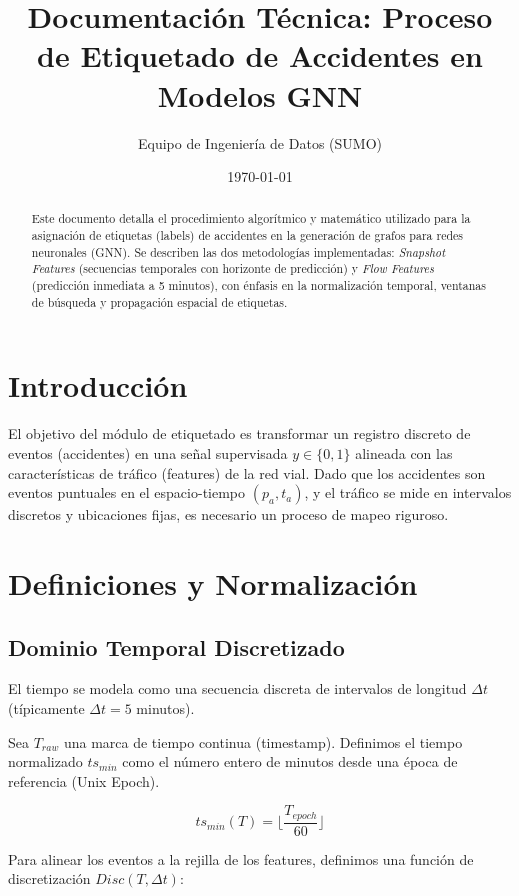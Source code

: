 \documentclass[11pt, letterpaper]{article}
\title{\textbf{Documentación Técnica: Proceso de Etiquetado de Accidentes en Modelos GNN}}
\author{Equipo de Ingeniería de Datos (SUMO)}
\date{\today}
\begin{document}
\maketitle

\begin{abstract}
Este documento detalla el procedimiento algorítmico y matemático utilizado para la asignación de etiquetas (labels) de accidentes en la generación de grafos para redes neuronales (GNN). Se describen las dos metodologías implementadas: \textit{Snapshot Features} (secuencias temporales con horizonte de predicción) y \textit{Flow Features} (predicción inmediata a 5 minutos), con énfasis en la normalización temporal, ventanas de búsqueda y propagación espacial de etiquetas.
\end{abstract}

\tableofcontents

\section{Introducción}
El objetivo del módulo de etiquetado es transformar un registro discreto de eventos (accidentes) en una señal supervisada $y \in \{0, 1\}$ alineada con las características de tráfico (features) de la red vial. Dado que los accidentes son eventos puntuales en el espacio-tiempo $(p_a, t_a)$, y el tráfico se mide en intervalos discretos y ubicaciones fijas, es necesario un proceso de mapeo riguroso.

\section{Definiciones y Normalización}

\subsection{Dominio Temporal Discretizado}
El tiempo se modela como una secuencia discreta de intervalos de longitud $\Delta t$ (típicamente $\Delta t = 5$ minutos).

Sea $T_{raw}$ una marca de tiempo continua (timestamp). Definimos el tiempo normalizado $ts_{min}$ como el número entero de minutos desde una época de referencia (Unix Epoch).

\begin{equation}
    ts_{min}(T) = \lfloor \frac{T_{epoch}}{60} \rfloor
\end{equation}

Para alinear los eventos a la rejilla de los features, definimos una función de discretización $Disc(T, \Delta t)$:
\end{document}
